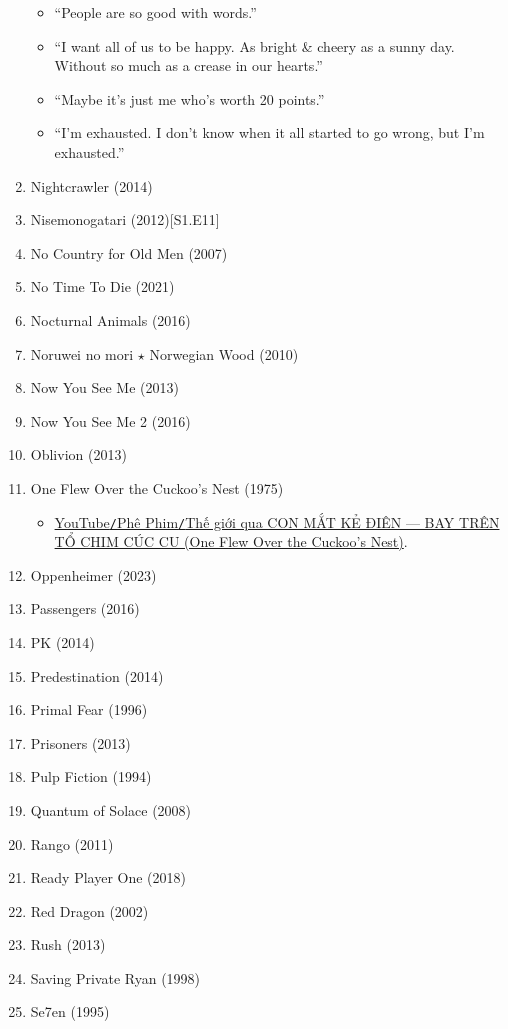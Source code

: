 \documentclass{article}
\begin{document}
\begin{enumerate}
\begin{itemize}
		\item ``People are so good with words.''
		\item ``I want all of us to be happy. As bright \& cheery as a sunny day. Without so much as a crease in our hearts.''
		\item ``Maybe it's just me who's worth 20 points.''
		\item ``I'm exhausted. I don't know when it all started to go wrong, but I'm exhausted.''
	\end{itemize}	
	\item {\sc Nightcrawler} (2014)
	\item {\sc Nisemonogatari} (2012)\hfill[S1.E11]
	\item {\sc No Country for Old Men} (2007)
	\item No Time To Die (2021)
	\item {\sc Nocturnal Animals} (2016)
	\item {\sc Noruwei no mori $\star$ Norwegian Wood} (2010)
	\item {\sc Now You See Me} (2013)
	\item {\sc Now You See Me 2} (2016)
	\item {\sc Oblivion} (2013)
	\item One Flew Over the Cuckoo's Nest (1975)
	\begin{itemize}
		\item \href{https://www.youtube.com/watch?v=-FUAeLmb5wE}{YouTube{\tt/}Phê Phim{\tt/}Thế giới qua CON MẮT KẺ ĐIÊN — BAY TRÊN TỔ CHIM CÚC CU (One Flew Over the Cuckoo's Nest)}.
	\end{itemize}
	\item {\sc Oppenheimer} (2023)
	\item {\sc Passengers} (2016)
	\item {\sc PK} (2014)
	\item {\sc Predestination} (2014)
	\item {\sc Primal Fear} (1996)
	\item {\sc Prisoners} (2013)
	\item {\sc Pulp Fiction} (1994)
	\item {\sc Quantum of Solace} (2008)
	\item {\sc Rango} (2011)
	\item {\sc Ready Player One} (2018)
	\item {\sc Red Dragon} (2002)
	\item {\sc Rush} (2013)
	\item {\sc Saving Private Ryan} (1998)
	\item {\sc Se7en} (1995)

\end{enumerate}
\end{document}
